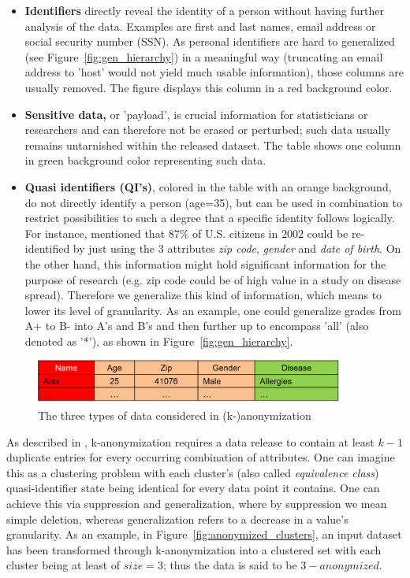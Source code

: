 \documentclass{llncs}
\begin{document}
\begin{itemize}
	\item \textbf{Identifiers} directly reveal the identity of a person without having further analysis of the data. Examples are first and last names, email address or social security number (SSN). As personal identifiers are hard to generalized (see Figure~\ref{fig:gen_hierarchy}) in a meaningful way (truncating an email address to 'host' would not yield much usable information), those columns are usually removed. The figure displays this column in a red background color.
	\item \textbf{Sensitive data,} or 'payload', is crucial information for statisticians or researchers and can therefore not be erased or perturbed; such data usually remains untarnished within the released dataset. The table shows one column in green background color representing such data.
	\item \textbf{Quasi identifiers (QI's)}, colored in the table with an orange background, do not directly identify a person (age=35), but can be used in combination to restrict possibilities to such a degree that a specific identity follows logically. For instance, \cite{sweeney2002k} mentioned that 87\% of U.S. citizens in 2002 could be re-identified by just using the 3 attributes \textit{zip code}, \textit{gender} and \textit{date of birth}. On the other hand, this information might hold significant information for the purpose of research (e.g. zip code could be of high value in a study on disease spread). Therefore we generalize this kind of information, which means to lower its level of granularity. As an example, one could generalize grades from A+ to B- into A's and B's and then further up to encompass 'all' (also denoted as '*'), as shown in Figure~\ref{fig:gen_hierarchy}.
\end{itemize}

\begin{figure}[H]
	\begin{center}
		\includegraphics[width=0.9\textwidth]{./figures/theory/3typesofdata}
		\caption{The three types of data considered in (k-)anonymization}
		\label{fig:anon_categories}
	\end{center}
\end{figure}

As described in \cite{ciriani2007kappa}, k-anonymization requires a data release to contain at least $k-1$ duplicate entries for every occurring combination of attributes. One can imagine this as a clustering problem with each cluster's (also called \textit{equivalence class}) quasi-identifier state being identical for every data point it contains. One can achieve this via suppression and generalization, where by suppression we mean simple deletion, whereas generalization refers to a decrease in a value's granularity. As an example, in Figure~\ref{fig:anonymized_clusters}, an input dataset has been transformed through k-anonymization into a clustered set with each cluster being at least of $size = 3$; thus the data is said to be $3-anonymized$.
\end{document}
